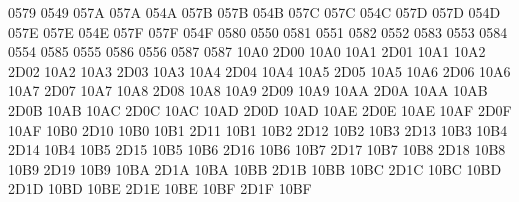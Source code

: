  0579 0549 %
\setcclcuc 057A 057A 054A %
\setcclcuc 057B 057B 054B %
\setcclcuc 057C 057C 054C %
\setcclcuc 057D 057D 054D %
\setcclcuc 057E 057E 054E %
\setcclcuc 057F 057F 054F %
 0580 0550 %
 0581 0551 %
 0582 0552 %
 0583 0553 %
 0584 0554 %
 0585 0555 %
 0586 0556 %
 0587 0587 %
\setcclcuc 10A0 2D00 10A0 %
\setcclcuc 10A1 2D01 10A1 %
\setcclcuc 10A2 2D02 10A2 %
\setcclcuc 10A3 2D03 10A3 %
\setcclcuc 10A4 2D04 10A4 %
\setcclcuc 10A5 2D05 10A5 %
\setcclcuc 10A6 2D06 10A6 %
\setcclcuc 10A7 2D07 10A7 %
\setcclcuc 10A8 2D08 10A8 %
\setcclcuc 10A9 2D09 10A9 %
\setcclcuc 10AA 2D0A 10AA %
\setcclcuc 10AB 2D0B 10AB %
\setcclcuc 10AC 2D0C 10AC %
\setcclcuc 10AD 2D0D 10AD %
\setcclcuc 10AE 2D0E 10AE %
\setcclcuc 10AF 2D0F 10AF %
\setcclcuc 10B0 2D10 10B0 %
\setcclcuc 10B1 2D11 10B1 %
\setcclcuc 10B2 2D12 10B2 %
\setcclcuc 10B3 2D13 10B3 %
\setcclcuc 10B4 2D14 10B4 %
\setcclcuc 10B5 2D15 10B5 %
\setcclcuc 10B6 2D16 10B6 %
\setcclcuc 10B7 2D17 10B7 %
\setcclcuc 10B8 2D18 10B8 %
\setcclcuc 10B9 2D19 10B9 %
\setcclcuc 10BA 2D1A 10BA %
\setcclcuc 10BB 2D1B 10BB %
\setcclcuc 10BC 2D1C 10BC %
\setcclcuc 10BD 2D1D 10BD %
\setcclcuc 10BE 2D1E 10BE %
\setcclcuc 10BF 2D1F 10BF %
